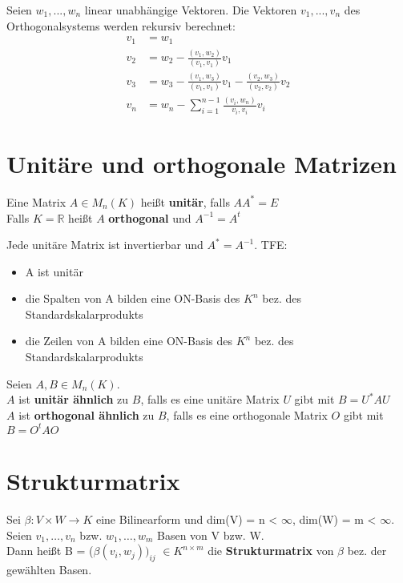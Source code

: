 \begin{theorem}
Seien $w_1,...,w_n$ linear unabhängige Vektoren. Die Vektoren $v_1,...,v_n$ des Orthogonalsystems werden rekursiv berechnet:
\begin{align*}
v_1 &= w_1\\
v_2 &= w_2 - \frac{(v_1,w_2)}{(v_1,v_1)}v_1\\
v_3 &= w_3 - \frac{(v_1,w_3)}{(v_1,v_1)}v_1 - \frac{(v_2,w_3)}{(v_2,v_2)}v_2\\
v_n &= w_n - \sum_{i=1}^{n-1}\frac{(v_i,w_n)}{v_i,v_i}v_i
\end{align*}
\end{theorem}

\section{Unitäre und orthogonale Matrizen}
\begin{definition}
Eine Matrix $A \in M_n(K)$ heißt \textbf{unitär}, falls $AA^* = E$\\
Falls $K = \mathbb{R}$ heißt $A$ \textbf{orthogonal} und $A^{-1} = A^t$
\end{definition}
\begin{theorem}
Jede unitäre Matrix ist invertierbar und $A^* = A^{-1}$. TFE:
\begin{itemize}
	\item A ist unitär
	\item die Spalten von A bilden eine ON-Basis des $K^n$ bez. des Standardskalarprodukts
	\item die Zeilen von A bilden eine ON-Basis des $K^n$ bez. des Standardskalarprodukts
\end{itemize}
\end{theorem}

\begin{definition}
Seien $A, B \in M_n(K)$.\\
$A$ ist \textbf{unitär ähnlich} zu $B$, falls es eine unitäre Matrix $U$ gibt mit $B = U^*AU$\\
$A$ ist \textbf{orthogonal ähnlich} zu $B$, falls es eine orthogonale Matrix $O$ gibt mit $B = O^tAO$
\end{definition}

\section{Strukturmatrix}
\begin{definition}
Sei $\beta: V \times W \to K$ eine Bilinearform und dim(V) = n < $\infty$, dim(W) = m < $\infty$. Seien $v_1, …, v_n$ bzw. $w_1, …, w_m$ Basen von V bzw. W.\\
Dann heißt B = ($\beta(v_i, w_j))_{ij}$ $\in K^{n \times m}$ die \textbf{Strukturmatrix} von $\beta$ bez. der gewählten Basen.
\end{definition}

